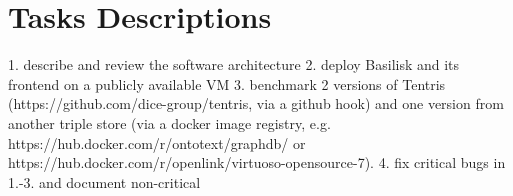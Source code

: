 \chapter{Tasks Descriptions}
\label{ch:tasks}

1. describe and review the software architecture
2. deploy Basilisk and its frontend on a publicly available VM
3. benchmark 2 versions of Tentris
(https://github.com/dice-group/tentris, via a github hook) and
one version from another triple store (via a docker image
registry, e.g. https://hub.docker.com/r/ontotext/graphdb/ or
https://hub.docker.com/r/openlink/virtuoso-opensource-7).
4. fix critical bugs in 1.-3. and document non-critical